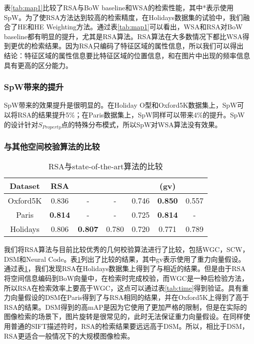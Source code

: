 表\ref{tab:map1}比较了RSA与BoW baseline和WSA\cite{penatti2014visual}的检索性能，其中*表示使用SpW。为了使RSA方法达到较高的检索精度，在Holidays数据集的试验中，我们融合了HE\cite{jegou2008hamming}和HE Weighting\cite{jegou2009burstiness}方法。通过表\ref{tab:map1}可以看出，WSA和RSA对BoW baseline都有明显的提升，尤其是RSA算法。RSA算法在大多数情况下都比WSA得到更优的检索结果。因为RSA只编码了特征区域的属性信息，所以我们可以得出结论：特征区域的属性信息要比特征区域的位置信息\cite{penatti2014visual}，和在图片中出现的频率信息具有更高的区分能力。

\subsubsection{SpW带来的提升}
SpW带来的效果提升是很明显的。在Holiday O型和Oxford5K数据集上，SpW可以将RSA的结果提升5\%；在Paris数据集上，SpW同样可以带来4\%的提升。SpW的设计针对$S_{Property}$点的特殊分布模式，所以SpW对WSA算法没有效果。

\subsubsection{与其他空间校验算法的比较}
\begin{table}
	\begin{center}
		\begin{tabular}{|c|c|c|c|c|c|c|}
			\hline
			Dataset   & RSA     & \cite{jegou2009burstiness}   &\cite{wang2011contextual}    & \cite{Zhong2015Fast}    & \cite{Zhong2015Fast}(gv)  &\cite{babenko2014neural}\\
			\hline\hline
			Oxford5K  & 0.836   & -      & -      & 0.746  & \textbf{0.850}  & 0.557\\
			\hline
			Paris     & \textbf{0.814}   & -      & -      & 0.725  & \textbf{0.814}  & -\\
			\hline
			Holidays  & 0.806   & \textbf{0.807}  & 0.780  & 0.720  & 0.771  & 0.789\\
			\hline
		\end{tabular}
	\end{center}
	\caption{RSA与state-of-the-art算法的比较}
	\label{tab:map2}
\end{table}

我们将RSA算法与目前比较优秀的几何校验算法进行了比较，包括WGC\cite{jegou2008hamming}\cite{jegou2009burstiness}，SCW\cite{wang2011contextual}，DSM\cite{Zhong2015Fast}和Neural Code\cite{babenko2014neural}。表\ref{tab:map2}列出了比较的结果，其中gv表示使用了重力向量假设。通过表\ref{tab:map2}，我们发现RSA在Holidays数据集上得到了与\cite{jegou2009burstiness}相近的结果。但是由于RSA将空间信息编码到BoW向量中，在检索时完成校验，而WGC是一种后检验方法，所以RSA在检索效率上要高于WGC，这点可以通过表\ref{tab:time}得到验证。具有重力向量假设的DSM在Paris得到了与RSA相同的结果，并在Oxford5K上得到了高于RSA的结果。DSM得到的高mAP是因为它使用了更加严格的限制，但是在实际的图像检索的场景下，图片旋转是很常见的，此时无法保证重力向量假设。在同样使用普通的SIFT描述符\cite{lowe2004distinctive}时，RSA的检索结果要远远高于DSM。所以，相比于DSM，RSA更适合一般情况下的大规模图像检索。

